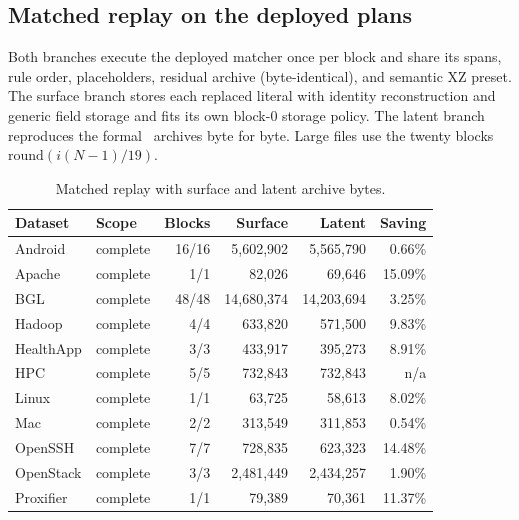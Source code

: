 \subsection{Matched replay on the deployed plans}

Both branches execute the deployed matcher once per block and share its spans, rule order, placeholders, residual archive (byte-identical), and semantic XZ preset. The surface branch stores each replaced literal with identity reconstruction and generic field storage and fits its own block-0 storage policy. The latent branch reproduces the formal \tool\ archives byte for byte. Large files use the twenty blocks $\mathrm{round}(i(N-1)/19)$.

\begin{longtable}{llrrrr}\caption{Matched replay with surface and latent archive bytes.}\label{tab:replay16}\\\toprule

Dataset & Scope & Blocks & Surface & Latent & Saving \\\midrule

Android & complete & 16/16 & 5,602,902 & 5,565,790 & 0.66\% \\

Apache & complete & 1/1 & 82,026 & 69,646 & 15.09\% \\

BGL & complete & 48/48 & 14,680,374 & 14,203,694 & 3.25\% \\

Hadoop & complete & 4/4 & 633,820 & 571,500 & 9.83\% \\

HealthApp & complete & 3/3 & 433,917 & 395,273 & 8.91\% \\

HPC & complete & 5/5 & 732,843 & 732,843 & n/a \\

Linux & complete & 1/1 & 63,725 & 58,613 & 8.02\% \\

Mac & complete & 2/2 & 313,549 & 311,853 & 0.54\% \\

OpenSSH & complete & 7/7 & 728,835 & 623,323 & 14.48\% \\

OpenStack & complete & 3/3 & 2,481,449 & 2,434,257 & 1.90\% \\

Proxifier & complete & 1/1 & 79,389 & 70,361 & 11.37\% \\


\end{longtable}
